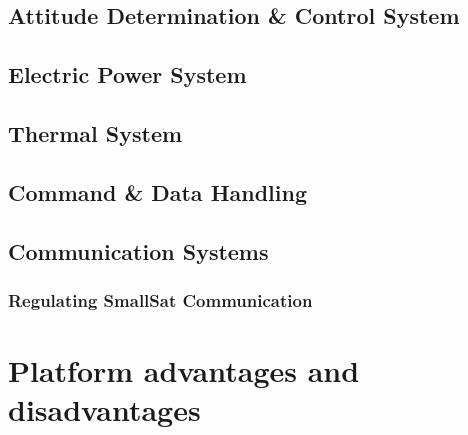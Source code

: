 {\small\textit{\lipsum[1-2]}}

\subsection{Attitude Determination \& Control System}
\label{subsec:ADCS}

{\small\textit{\lipsum[1-2]}}

\subsection{Electric Power System}
\label{subsec:Power}

{\small\textit{\lipsum[1-2]}}

\subsection{Thermal System}
\label{subsec:Thermal}

{\small\textit{\lipsum[1-2]}}

\subsection{Command \& Data Handling}
\label{subsec:C_DH}

{\small\textit{\lipsum[1-2]}}

\subsection{Communication Systems}
\label{subsec:Comm}

{\small\textit{\lipsum[1-2]}}

\subsubsection{Regulating SmallSat Communication}
\label{subsec:Reg_Comm}

{\small\textit{\lipsum[1-2]}}


\section{Platform advantages and disadvantages}
\label{sec:SmallSat_AdvantDisadvanteges}

{\small\textit{\lipsum[1-2]}}


